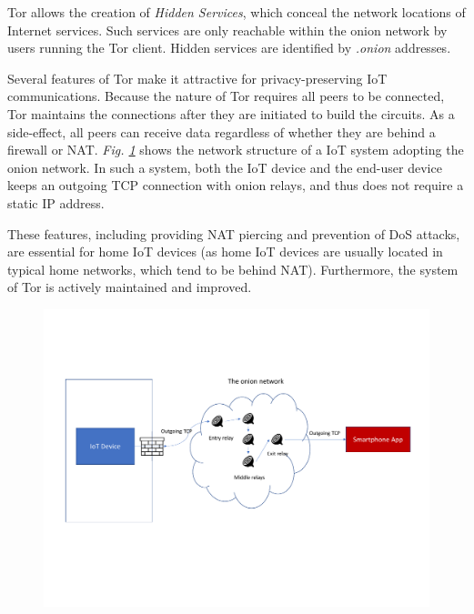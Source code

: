 Tor allows the creation of \textit{Hidden Services}, which conceal the network locations of Internet services. Such services are only reachable within the onion network by users running the Tor client. Hidden services are identified by \textit{.onion} addresses.

Several features of Tor make it attractive for privacy-preserving IoT communications. Because the nature of Tor requires all peers to be connected, Tor maintains the connections after they are initiated to build the circuits. As a side-effect, all peers can receive data regardless of whether they are behind a firewall or NAT. \textit{Fig. \ref{fig:natpiercing}} shows the network structure of a IoT system adopting the onion network. In such a system, both the IoT device and the end-user device keeps an outgoing TCP connection with onion relays, and thus does not require a static IP address.

These features, including providing NAT piercing and prevention of DoS attacks, are essential for home IoT devices (as home IoT devices are usually located in typical home networks, which tend to be behind NAT). Furthermore, the system of Tor is actively maintained and improved.

\begin{figure}
	\includegraphics[width=\linewidth]{natpiercing.pdf}
	\caption{}
	\label{fig:natpiercing}
\end{figure}